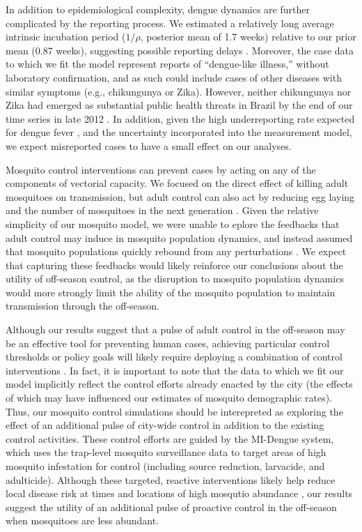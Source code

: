\documentclass[10pt,letterpaper]{article}
\begin{document}
In addition to epidemiological complexity, dengue dynamics are further complicated by the reporting process.
We estimated a relatively long average intrinsic incubation period ($1/\rho$, posterior mean of 1.7 weeks) relative to our prior mean (0.87 weeks), suggesting possible reporting delays \cite{Reich2016}.
Moreover, the case data to which we fit the model represent reports of ``dengue-like illness,'' without laboratory confirmation, and as such could include cases of other diseases with similar symptoms (e.g., chikungunya or Zika).
However, neither chikungunya nor Zika had emerged as substantial public health threats in Brazil by the end of our time series in late 2012 \cite{PAHO2014, PAHO2015}.
In addition, given the high underreporting rate expected for dengue fever \cite{Silva2016}, and the uncertainty incorporated into the measurement model, we expect misreported cases to have a small effect on our analyses.

Mosquito control interventions can prevent cases by acting on any of the components of vectorial capacity.
We focused on the direct effect of killing adult mosquitoes on transmission, but adult control can also act by reducing egg laying and the number of mosquitoes in the next generation \cite{Brady2016}.
Given the relative simplicity of our mosquito model, we were unable to eplore the feedbacks that adult control may induce in mosquito population dynamics, and instead assumed that mosquito populations quickly rebound from any perturbations \cite{Focks1987}.
We expect that capturing these feedbacks would likely reinforce our conclusions about the utility of off-season control, as the disruption to mosquito population dynamics would more strongly limit the ability of the mosquito population to maintain transmission through the off-season.

Although our results suggest that a pulse of adult control in the off-season may be an effective tool for preventing human cases, achieving particular control thresholds or policy goals will likely require deploying a combination of control interventions \cite{Brady2016}.
In fact, it is important to note that the data to which we fit our model implicitly reflect the control efforts already enacted by the city (the effects of which may have influenced our estimates of mosquito demographic rates).
Thus, our mosquito control simulations should be interepreted as exploring the effect of an additional pulse of city-wide control in addition to the existing control activities.
These control efforts are guided by the MI-Dengue system, which uses the trap-level mosquito surveillance data to target areas of high mosquito infestation for control (including source reduction, larvacide, and adulticide)\cite{Eiras2009}.
Although these targeted, reactive interventions likely help reduce local disease risk at times and locations of high mosqutio abundance \cite{Pepin2013}, our results suggest the utility of an additional pulse of proactive control in the off-season when mosquitoes are less abundant.
\end{document}
